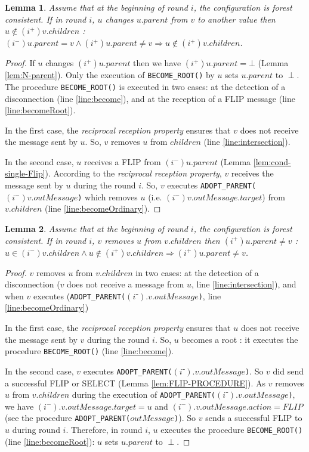 \documentclass[twocolumn]{article}
\newtheorem{lemma}{Lemma}
\newcommand{\state}[3]{\ensuremath{(#2^{#3})#1}}
\newcommand{\uim}{\state{u}{i}{-}}
\newcommand{\vim}{\state{v}{i}{-}}
\newcommand{\uip}{\state{u}{i}{+}}
\newcommand{\vip}{\state{v}{i}{+}}
\begin{document}
\begin{lemma}
  \label{lem:rem_parent_rem_child}
Assume that at the beginning of round $i$, the configuration is forest consistent. If in round $i$, $u$ changes $u.parent$ from $v$ to another value then 
$u \not \in \vip.children$ : 
$\uim.parent = v \wedge \uip.parent \neq v \Rightarrow u \not 
\in \vip.children$.
\end{lemma}

\begin{proof}
If $u$ changes $\uip.parent$ then we have $\uip.parent = \bot$ (Lemma \ref{lem:N-parent}).
Only the execution of \texttt{BECOME\_ROOT()} by $u$ sets $u.parent$ 
to $\perp$. The procedure \texttt{BECOME\_ROOT()} is executed
in two cases: at the detection of a disconnection (line \ref{line:become}), and
at the reception of a FLIP message (line \ref{line:becomeRoot}).

In the first case, the \textit{reciprocal reception property} ensures that $v$ 
does not receive the message sent by $u$.
So, $v$  removes $u$ from $children$ (line \ref{line:intersection}).

In the second case, $u$ receives a FLIP from $\uim.parent$ (Lemma 
 \ref{lem:cond-single-Flip}).
According to the \textit{reciprocal reception property}, $v$ receives the message sent by $u$ during the round $i$.
So, $v$ executes \texttt{ADOPT\_PARENT($(i^-)v.outMessage$)} which removes 
$u$ (i.e. $(i^-)v.outMessage.target$) from $v.children$ (line \ref{line:becomeOrdinary}).
 \end{proof}


\begin{lemma}
  \label{lem:rem_child_rem_parent}
Assume that at the beginning of round $i$, the configuration is forest consistent.  
 If in round $i$, $v$ removes $u$ from $v.children$ 
then $\uip.parent \neq v$ : $u \in \vim.children \wedge u 
\not \in \vip.children \Rightarrow \uip.parent \neq v$.
\end{lemma}
\begin{proof}
$v$ removes $u$ from $v.children$ in two cases: 
at the detection of a disconnection 
($v$ does not receive a message from $u$, line \ref{line:intersection}), and
when $v$ executes (\texttt{ADOPT\_PARENT($(i⁻).v.outMessage$)}, line \ref{line:becomeOrdinary}) 

In the first case, the \textit{reciprocal reception property} ensures that 
$u$ does not receive the message sent by $v$ during the round $i$.
So, $u$ becomes a root : it executes the procedure
\texttt{BECOME\_ROOT()} (line \ref{line:become}).

In the second case, $v$ executes \texttt{ADOPT\_PARENT($(i⁻).v.outMessage$)}.
So $v$ did send a successful FLIP or SELECT (Lemma \ref{lem:FLIP-PROCEDURE}).
As $v$ removes $u$ from $v.children$ during the execution of
\texttt{ADOPT\_PARENT($(i⁻).v.outMessage$)},
  we have $(i^-).v.outMessage.target=u$ and
$(i^-).v.outMessage.action=FLIP$ (see the procedure \texttt{ADOPT\_PARENT($outMessage$)}).
So $v$ sends
a successful FLIP to $u$  during round $i$.
Therefore, in round $i$, $u$ 
executes the procedure \texttt{BECOME\_ROOT()} (line \ref{line:becomeRoot}):
$u$ sets $u.parent$ to $\perp$.
 \end{proof}
\end{document}
